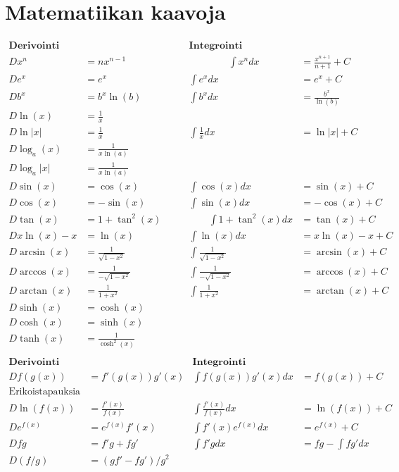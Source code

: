 \documentclass[12pt]{article}
\begin{document}
\section{Matematiikan kaavoja}

$$
\begin{array}{rl|rl}
\textbf{Derivointi} && \textbf{Integrointi}&\\[2mm]
Dx^n&=nx^{n-1}     \qquad\qquad&\qquad\qquad\int x^ndx&=\frac{x^{n+1}}{n+1}+C \\[2mm]
De^x&=e^x &\int e^xdx&=e^x+C\\[2mm]
Db^x&=b^x\ln(b) & \int b^xdx&=\frac{b^x}{\ln(b)}\\[2mm]
D\ln(x)&=\frac{1}{x} &&\\[2mm]
D\ln|x|&=\frac{1}{x} &\int\frac{1}{x}dx&=\ln|x|+C\\[2mm]
D\log_a(x)&=\frac{1}{x\ln(a)} &&\\[2mm]
D\log_a|x|&=\frac{1}{x\ln(a)} &&\\[2mm]
D\sin(x)&=\cos(x)   &\int\cos(x)dx&=\sin(x)+C\\[2mm]
D\cos(x)&=-\sin(x)  &\int\sin(x)dx&=-\cos(x)+C\\[2mm]
D\tan(x)&=1+\tan^2(x) \qquad&\qquad\int 1+\tan^2(x)dx&=\tan(x)+C\\[2mm]

Dx\ln(x)-x&=\ln(x) & \int\ln(x)dx&=x\ln(x)-x+C\\[10mm]

D\arcsin(x)&=\frac{1}{\sqrt{1-x^2}} & \int\frac{1}{\sqrt{1-x^2}}&=\arcsin(x)+C\\
D\arccos(x)&=\frac{1}{-\sqrt{1-x^2}} & \int\frac{1}{-\sqrt{1-x^2}}&=\arccos(x)+C\\
D\arctan(x)&=\frac{1}{1+x^2} & \int\frac{1}{1+x^2}&=\arctan(x)+C\\

D\sinh(x)&=\cosh(x) &&\\
D\cosh(x)&=\sinh(x) &&\\
D\tanh(x)&=\frac{1}{\cosh^2(x)} &&\\
\end{array}  
$$
\vspace{1cm}
$$
\begin{array}{rl|rl}
\textbf{Derivointi} && \textbf{Integrointi}&\\[2mm]
D f(g(x))&=f'(g(x))g'(x) & \int f(g(x))g'(x)dx&=f(g(x))+C\\[2mm]
\textrm{Erikoistapauksia} &&&\\
D\ln(f(x))&=\frac{f'(x)}{f(x)} & \int \frac{f'(x)}{f(x)}dx&=\ln(f(x))+C\\[2mm]
D e^{f(x)}&=e^{f(x)}f'(x) & \int f'(x)e^{f(x)}dx&=e^{f(x)}+C\\[10mm]
D fg&=f'g+fg'& \int f'g dx&=fg-\int fg'dx\\[2mm]
D (f/g)&=(gf'-fg')/g^2 &&\\[2mm]
\end{array}  
$$
\end{document}
